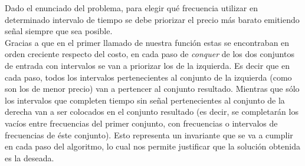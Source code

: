 Dado el enunciado del problema, para elegir qu\'e frecuencia utilizar en determinado intervalo de tiempo se debe priorizar el precio m\'as barato emitiendo se\~nal siempre que sea posible.\\

Gracias a que en el primer llamado de nuestra funci\'on estas se encontraban en orden creciente respecto del costo, en cada paso de \emph{conquer} de los dos conjuntos de entrada con intervalos se van a priorizar los de la izquierda. Es decir que en cada paso, todos los intervalos pertenecientes al conjunto de la izquierda (como son los de menor precio) van a pertencer al conjunto resultado. Mientras que s\'olo los intervalos que completen tiempo sin se\~nal pertenecientes al conjunto de la derecha van a ser colocados en el conjunto resultado (es decir, se completarán los vacíos entre frecuencias del primer conjunto, con frecuencias o intervalos de frecuencias de \'este conjunto). Esto representa un invariante que se va a cumplir en cada paso del algoritmo, lo cual nos permite justificar que la soluci\'on obtenida es la deseada.\\

